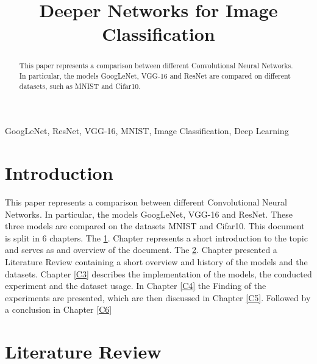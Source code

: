 \documentclass[conference]{IEEEtran}
\begin{document}
\title{Deeper Networks for Image Classification}

\author{
}

\maketitle

\begin{abstract}
This paper represents a comparison between different Convolutional Neural Networks. In particular, the models GoogLeNet, VGG-16 and ResNet are compared on different datasets, such as MNIST and Cifar10.
\end{abstract}

\begin{IEEEkeywords}
GoogLeNet, ResNet, VGG-16, MNIST, Image Classification, Deep Learning
\end{IEEEkeywords}

\section{Introduction}\label{C1}
This paper represents a comparison between different Convolutional Neural Networks. In particular, the models GoogLeNet, VGG-16 and ResNet. These three models are compared on the datasets MNIST and Cifar10.
This document is split in 6 chapters. The \ref{C1}. Chapter represents a short introduction to the topic and serves as and overview of the document.
The \ref{C2}. Chapter presented a Literature Review containing a short overview and history of the models and the datasets.
Chapter \ref{C3} describes the implementation of the models, the conducted experiment and the dataset usage.
In Chapter \ref{C4} the Finding of the experiments are presented, which are then discussed in Chapter \ref{C5}.
Followed by a conclusion in Chapter \ref{C6}

\section{Literature Review}\label{C2}
\end{document}

